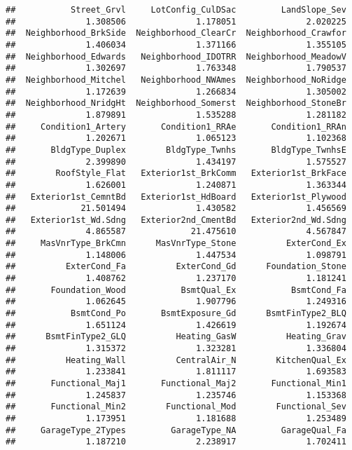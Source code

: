 \documentclass[
]{article}
\begin{document}
\begin{verbatim}
##           Street_Grvl     LotConfig_CulDSac         LandSlope_Sev 
##              1.308506              1.178051              2.020225 
##  Neighborhood_BrkSide  Neighborhood_ClearCr  Neighborhood_Crawfor 
##              1.406034              1.371166              1.355105 
##  Neighborhood_Edwards   Neighborhood_IDOTRR  Neighborhood_MeadowV 
##              1.302697              1.763348              1.790537 
##  Neighborhood_Mitchel   Neighborhood_NWAmes  Neighborhood_NoRidge 
##              1.172639              1.266834              1.305002 
##  Neighborhood_NridgHt  Neighborhood_Somerst  Neighborhood_StoneBr 
##              1.879891              1.535288              1.281182 
##     Condition1_Artery       Condition1_RRAe       Condition1_RRAn 
##              1.202671              1.065123              1.102368 
##       BldgType_Duplex        BldgType_Twnhs       BldgType_TwnhsE 
##              2.399890              1.434197              1.575527 
##        RoofStyle_Flat   Exterior1st_BrkComm   Exterior1st_BrkFace 
##              1.626001              1.240871              1.363344 
##   Exterior1st_CemntBd   Exterior1st_HdBoard   Exterior1st_Plywood 
##             21.501494              1.430582              1.456569 
##   Exterior1st_Wd.Sdng   Exterior2nd_CmentBd   Exterior2nd_Wd.Sdng 
##              4.865587             21.475610              4.567847 
##     MasVnrType_BrkCmn      MasVnrType_Stone          ExterCond_Ex 
##              1.148006              1.447534              1.098791 
##          ExterCond_Fa          ExterCond_Gd      Foundation_Stone 
##              1.408762              1.237170              1.181241 
##       Foundation_Wood           BsmtQual_Ex           BsmtCond_Fa 
##              1.062645              1.907796              1.249316 
##           BsmtCond_Po       BsmtExposure_Gd      BsmtFinType2_BLQ 
##              1.651124              1.426619              1.192674 
##      BsmtFinType2_GLQ          Heating_GasW          Heating_Grav 
##              1.315372              1.323281              1.336804 
##          Heating_Wall          CentralAir_N        KitchenQual_Ex 
##              1.233841              1.811117              1.693583 
##       Functional_Maj1       Functional_Maj2       Functional_Min1 
##              1.245837              1.235746              1.153368 
##       Functional_Min2        Functional_Mod        Functional_Sev 
##              1.173951              1.181688              1.253489 
##     GarageType_2Types         GarageType_NA         GarageQual_Fa 
##              1.187210              2.238917              1.702411 

\end{verbatim}
\end{document}
